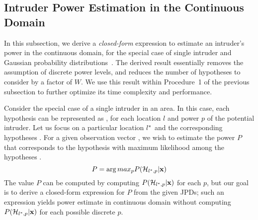 \subsection{Intruder Power Estimation in the Continuous Domain}
\label{sec:ipsn-power}

In this subsection, we derive a {\em closed-form} expression to estimate an
intruder's power in the continuous domain, for the special case of
single intruder and Gaussian probability
distributions~\cite{gauss}. The derived result essentially removes the
assumption of discrete power levels, and reduces the number of
hypotheses to consider by a factor of $W$. We use
this result within Procedure~1 of the previous subsection to further
optimize its time complexity and performance.

  Consider the
special case of a single intruder in an area. In this case, each
hypothesis can be represented as \hlp, for each location $l$ and power
$p$ of the potential intruder. Let us focus on a particular location
$l^*$ and the corresponding hypotheses \hLp. 
For a given observation vector \vx, we wish to estimate the power $P$
that corresponds to the hypothesis with maximum likelihood among the
hypotheses \hLp.
$$P = \arg max_p P(\mathcal{H}_{l^*,p} | \mathbf{x})$$
The value $P$ can be computed by computing $P(\mathcal{H}_{l^*,p} | \mathbf{x})$ for
each $p$, but our goal is to derive a closed-form expression for $P$
from the given JPDs; such an expression yields power estimate in
continuous domain without computing $P(\mathcal{H}_{l^*,p} | \mathbf{x})$ for each possible
discrete $p$.

